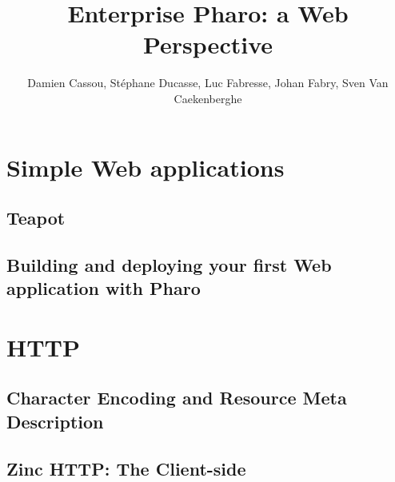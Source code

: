 \documentclass[10pt,twoside]{root/support/latex/sbabook}
\begin{document}
\frontmatter
\author{Damien Cassou, Stéphane Ducasse, Luc Fabresse, Johan Fabry, Sven Van Caekenberghe}
\title{Enterprise Pharo: a Web Perspective}
\maketitle
\tableofcontents

\sloppy %
\mainmatter



\part{Simple Web applications}

\chapter{Teapot}



\chapter{Building and deploying your first Web application with Pharo}



\part{HTTP}

\chapter{Character Encoding and Resource Meta Description}




\chapter{Zinc HTTP: The Client-side}

\end{document}
